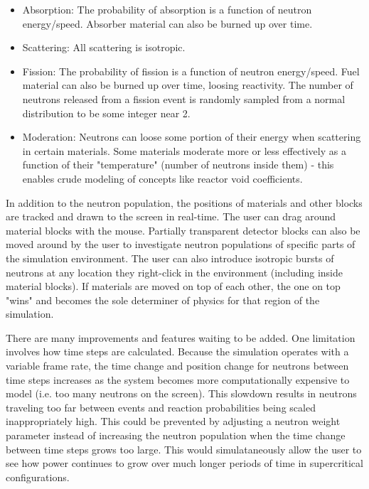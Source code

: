 \documentclass{anstrans}
\begin{document}
\begin{itemize}

    \item Absorption: The probability of absorption is a function of neutron
        energy/speed.  Absorber material can also be burned up over time.

    \item Scattering: All scattering is isotropic.

    \item Fission: The probability of fission is a function of neutron
        energy/speed.  Fuel material can also be burned up over time, loosing
        reactivity.  The number of neutrons released from a fission event is
        randomly sampled from a normal distribution to be some integer near 2.

    \item Moderation: Neutrons can loose some portion of their energy when
        scattering in certain materials. Some materials moderate more or less
        effectively as a function of their "temperature" (number of neutrons
        inside them) - this enables crude modeling of concepts like reactor
        void coefficients.

\end{itemize}

In addition to the neutron population, the positions of materials and other
blocks are tracked and drawn to the screen in real-time.  The user can drag
around material blocks with the mouse.  Partially transparent detector blocks
can also be moved around by the user to investigate neutron populations of
specific parts of the simulation environment.  The user can also introduce
isotropic bursts of neutrons at any location they right-click in the
environment (including inside material blocks).  If materials are moved on top
of each other, the one on top "wins" and becomes the sole determiner of
physics for that region of the simulation.

There are many improvements and features waiting to be added.  One limitation
involves how time steps are calculated.  Because the simulation operates with
a variable frame rate, the time change and position change for neutrons
between time steps increases as the system becomes more computationally
expensive to model (i.e. too many neutrons on the screen).  This slowdown
results in neutrons traveling too far between events and reaction
probabilities being scaled inappropriately high.  This could be prevented by
adjusting a neutron weight parameter instead of increasing the neutron
population when the time change between time steps grows too large.  This
would simulataneously allow the user to see how power continues to grow over
much longer periods of time in supercritical configurations.  
\end{document}
